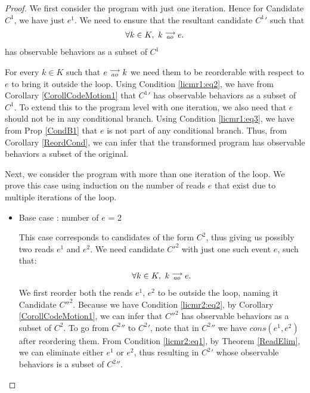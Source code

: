 \begin{proof}

    We first consider the program with just one iteration. 
    Hence for Candidate $C^1$, we have just $e^1$. 
    We need to ensure that the resultant candidate $C^1'$ such that 
    \begin{align*}
        \forall k \in K, \ k\stackrel{\longrightarrow}{_{ao}}e.
    \end{align*}  
    has observable behaviors as a subset of $C^1$

    For every $k \in K$ such that $e\stackrel{\longrightarrow}{_{ao}}k$ we need them to be reorderable with respect to $e$ to bring it outside the loop.
    Using Condition \ref{licmr1:eq2}, we have from Corollary \ref{CorollCodeMotion1} that $C^1'$ has observable behaviors as a subset of $C^1$.
    To extend this to the program level with one iteration, we also need that $e$ should not be in any conditional branch.
    Using Condition \ref{licmr1:eq3}, we have from Prop \ref{CondB1} that $e$ is not part of any conditional branch.
    Thus, from Corollary \ref{ReordCond}, we can infer that the transformed program has observable behaviors a subset of the original.  
    
    Next, we consider the program with more than one iteration of the loop. 
    We prove this case using induction on the number of reads $e$ that exist due to multiple iterations of the loop. 
    \begin{itemize}
        
        \item Base case : number of $e$ = 2
    
        This case corresponds to candidates of the form $C^2$, thus giving us possibly two reads $e^1$ and $e^2$.
        We need candidate $C'^2$ with just one such event $e$, such that:
        \begin{align*}
            \forall k \in K, \ k\stackrel{\longrightarrow}{_{ao}}e.
        \end{align*} 
        We first reorder both the reads $e^1$, $e^2$ to be outside the loop, naming it Candidate $C''^2$.
        Because we have Condition \ref{licmr2:eq2}, by Corollary \ref{CorollCodeMotion1}, we can infer that $C''^2$ has observable behaviors as a subset of $C^2$.
        To go from $C^2''$ to $C^2'$, note that in $C^2''$ we have $cons(e^1, e^2)$ after reordering them. 
        From Condition \ref{licmr2:eq1}, by Theorem \ref{ReadElim}, we can eliminate either $e^1$ or $e^2$, thus resulting in $C^2'$ whose observable behaviors is a subset of $C^2''$.
        

\end{itemize}
\end{proof}
